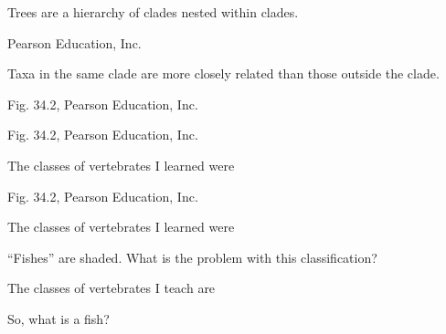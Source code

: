 \documentclass[t]{beamer}
\begin{document}
{
\begin{frame}[b]{Trees are a hierarchy of clades nested within clades.}

\tiny \textcopyright Pearson Education, Inc.
\end{frame}
}
{
\begin{frame}[b]{Taxa in the same clade are more closely related than those outside the clade.}

\end{frame}
}

%
{
\begin{frame}[b]

	\tiny Fig. 34.2, \textcopyright Pearson Education, Inc.
\end{frame}
}
%
%
{
\begin{frame}[t]{}

	
	\vfilll
	
	\tiny Fig. 34.2, \tiny \textcopyright Pearson Education, Inc.
\end{frame}
}
%
{
\begin{frame}[t]{The classes of vertebrates I learned were}

	\vfilll
	
	\tiny Fig. 34.2, \tiny \textcopyright Pearson Education, Inc.
\end{frame}
}
%
{
\begin{frame}[t]{The classes of vertebrates I learned were}

	\vspace*{-0.5\baselineskip}
	
	\hangpara “Fishes” are shaded. What is the problem with this classification?
		
\end{frame}
}
{
\begin{frame}[t]{The classes of vertebrates I teach are}

	\vspace*{-0.5\baselineskip}
	
	\hangpara So, what is a fish? \alt<handout>{}{\pause \highlight{You are!}}
	
\end{frame}
}
\end{document}

